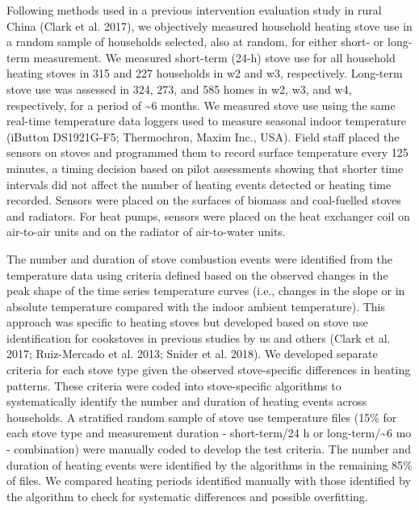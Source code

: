 \documentclass[
  letterpaper,
  DIV=11,
  numbers=noendperiod]{scrartcl}
\providecommand{\DIFadd}[1]{{\protect\color{blue}\uwave{#1}}} %
\providecommand{\DIFaddbegin}{} %
\providecommand{\DIFaddend}{} %
\providecommand{\DIFdelbegin}{} %
\providecommand{\DIFdelend}{} %
\newcommand{\DIFscaledelfig}{0.5}
\newlength{\DIFdelgraphicswidth} %
\newlength{\DIFdelgraphicsheight} %
\newcommand{\DIFaddincludegraphics}[2][]{{\color{blue}\fbox{\DIFOincludegraphics[#1]{#2}}}} %
\newcommand{\DIFdelincludegraphics}[2][]{%
\sbox{\DIFdelgraphicsbox}{\DIFOincludegraphics[#1]{#2}}%
\settoboxwidth{\DIFdelgraphicswidth}{\DIFdelgraphicsbox} %
\settoboxtotalheight{\DIFdelgraphicsheight}{\DIFdelgraphicsbox} %
\scalebox{\DIFscaledelfig}{%
\parbox[b]{\DIFdelgraphicswidth}{\usebox{\DIFdelgraphicsbox}\\[-\baselineskip] \rule{\DIFdelgraphicswidth}{0em}}\llap{\resizebox{\DIFdelgraphicswidth}{\DIFdelgraphicsheight}{%
\setlength{\unitlength}{\DIFdelgraphicswidth}%
\begin{picture}(1,1)%
\thicklines\linethickness{2pt} %
{\color[rgb]{1,0,0}\put(0,0){\framebox(1,1){}}}%
{\color[rgb]{1,0,0}\put(0,0){\line( 1,1){1}}}%
{\color[rgb]{1,0,0}\put(0,1){\line(1,-1){1}}}%
\end{picture}%
}\hspace*{3pt}}} %
} %
\DeclareRobustCommand{\DIFaddbegin}{\DIFOaddbegin \let\includegraphics\DIFaddincludegraphics} %
\DeclareRobustCommand{\DIFaddend}{\DIFOaddend \let\includegraphics\DIFOincludegraphics} %
\DeclareRobustCommand{\DIFdelbegin}{\DIFOdelbegin \let\includegraphics\DIFdelincludegraphics} %
\DeclareRobustCommand{\DIFdelend}{\DIFOaddend \let\includegraphics\DIFOincludegraphics} %
\begin{document}
Following methods used in a previous intervention evaluation study in
rural China (Clark et al. 2017), we objectively measured household
heating stove use in a random sample of households selected, also at
random, for either short- or long-term measurement. We measured
short-term (24-h) stove use for all household heating stoves in 315 and
227 households in w2 and w3, respectively. Long-term stove use was
assessed in 324, 273, and 585 homes in w2, w3, and w4, respectively, for
a period of \textasciitilde6 months. We measured stove use using the
same real-time temperature data loggers used to measure seasonal indoor
temperature (iButton DS1921G-F5; Thermochron, Maxim Inc., USA). Field
staff placed the sensors on stoves and programmed them to record surface
temperature every 125 minutes, a timing decision based on pilot
assessments showing that shorter time intervals did not affect the
number of heating events detected or heating time recorded. Sensors were
placed on the surfaces of biomass and coal-fuelled stoves and radiators.
For heat pumps, sensors were placed on the heat exchanger coil on
air-to-air units and on the radiator of air-to-water units.

The number and duration of stove combustion events were identified from
the temperature data using criteria defined based on the observed
changes in the peak shape of the time series temperature curves (i.e.,
changes in the slope or in absolute temperature compared with the indoor
ambient temperature). This approach was specific to heating stoves but
developed based on stove use identification for cookstoves in previous
studies by us and others (Clark et al. 2017; Ruiz-Mercado et al. 2013;
Snider et al. 2018). We developed separate criteria for each stove type
given the observed stove-specific differences in heating patterns. These
criteria were coded into stove-specific algorithms to systematically
identify the number and duration of heating events across households. A
stratified random sample of stove use temperature files (15\% for each
stove type and measurement duration - short-term/24 h or
long-term/\textasciitilde6 mo - combination) were manually coded to
develop the test criteria. The number and duration of heating events
were identified by the algorithms in the remaining 85\% of files. We
compared heating periods identified manually with those identified by
the algorithm to check for systematic differences and possible
overfitting.

\DIFdelbegin %
\DIFdelend \DIFaddbegin \subsubsection{\DIFadd{Questionnaires}}\label{questionnaires}
\DIFaddend 
\end{document}
